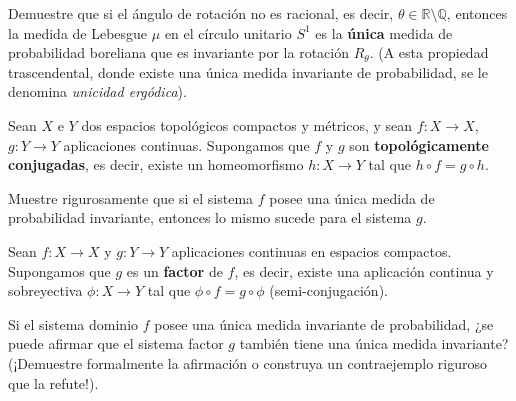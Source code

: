 \begin{ejercicio}
	Demuestre que si el ángulo de rotación no es racional, es decir, $\theta \in \mathbb{R} \setminus \mathbb{Q}$, entonces la medida de Lebesgue $\mu$ en el círculo unitario $S^1$ es la \textbf{única} medida de probabilidad boreliana que es invariante por la rotación $R_\theta$. (A esta propiedad trascendental, donde existe una única medida invariante de probabilidad, se le denomina \textit{unicidad ergódica}).
\end{ejercicio}

\begin{ejercicio}
	Sean $X$ e $Y$ dos espacios topológicos compactos y métricos, y sean $f: X \to X$, $g: Y \to Y$ aplicaciones continuas. Supongamos que $f$ y $g$ son \textbf{topológicamente conjugadas}, es decir, existe un homeomorfismo $h: X \to Y$ tal que $h \circ f = g \circ h$.
	
	Muestre rigurosamente que si el sistema $f$ posee una única medida de probabilidad invariante, entonces lo mismo sucede para el sistema $g$.
\end{ejercicio}

\begin{ejercicio}
	Sean $f: X \to X$ y $g: Y \to Y$ aplicaciones continuas en espacios compactos. Supongamos que $g$ es un \textbf{factor} de $f$, es decir, existe una aplicación continua y sobreyectiva $\phi: X \to Y$ tal que $\phi \circ f = g \circ \phi$ (semi-conjugación).
	
	Si el sistema dominio $f$ posee una única medida invariante de probabilidad, ¿se puede afirmar que el sistema factor $g$ también tiene una única medida invariante? (¡Demuestre formalmente la afirmación o construya un contraejemplo riguroso que la refute!).
\end{ejercicio}

